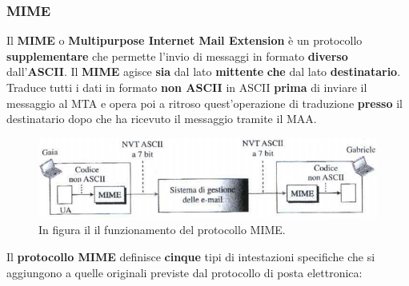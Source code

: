 \documentclass[11pt,a4paper,oneside]{book}
\theoremstyle{definition}
\begin{document}
\subsubsection{MIME}
Il \textbf{MIME} o \textbf{Multipurpose Internet Mail Extension} è un protocollo \textbf{supplementare} che permette l'invio di messaggi in formato \textbf{diverso} dall'\textbf{ASCII}. Il \textbf{MIME} agisce \textbf{sia} dal lato \textbf{mittente} \textbf{che} dal lato \textbf{destinatario}. Traduce tutti i dati in formato \textbf{non ASCII} in ASCII \textbf{prima} di inviare il messaggio al MTA e opera poi a ritroso quest'operazione di traduzione \textbf{presso} il destinatario dopo che ha ricevuto il messaggio tramite il MAA.
\begin{figure}[!h]
	\includegraphics[scale=0.55]{Immagini/MIME.png}
	\centering
	\caption{In figura il il funzionamento del protocollo MIME.}
\end{figure}\newline
Il \textbf{protocollo MIME} definisce \textbf{cinque} tipi di intestazioni specifiche che si aggiungono a quelle originali previste dal protocollo di posta elettronica:
\end{document}
